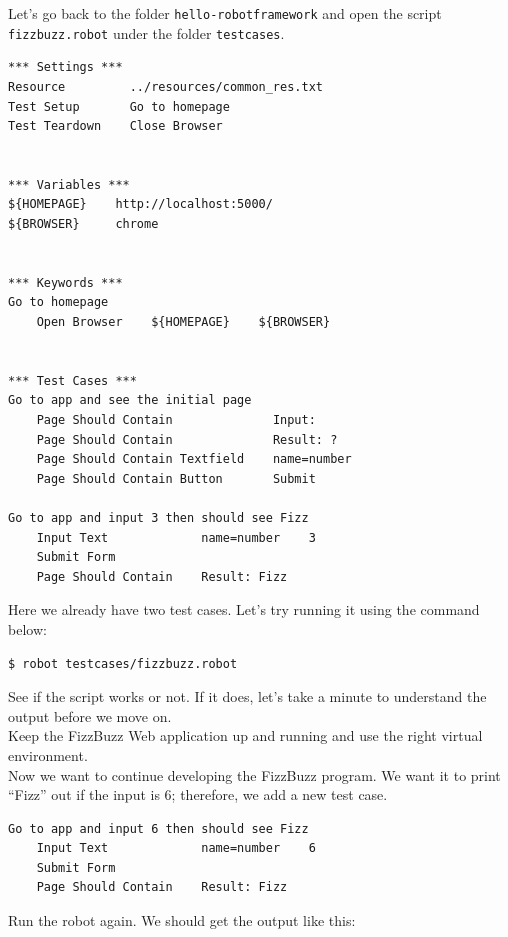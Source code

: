 \documentclass{article}
\begin{document}
\noindent Let's go back to the folder {\tt hello-robotframework} and open the
script {\tt fizzbuzz.robot} under the folder {\tt testcases}.

\begin{verbatim}
*** Settings ***
Resource         ../resources/common_res.txt
Test Setup       Go to homepage
Test Teardown    Close Browser


*** Variables ***
${HOMEPAGE}    http://localhost:5000/
${BROWSER}     chrome


*** Keywords ***
Go to homepage
    Open Browser    ${HOMEPAGE}    ${BROWSER}


*** Test Cases ***
Go to app and see the initial page
    Page Should Contain              Input:
    Page Should Contain              Result: ?
    Page Should Contain Textfield    name=number
    Page Should Contain Button       Submit

Go to app and input 3 then should see Fizz
    Input Text             name=number    3
    Submit Form
    Page Should Contain    Result: Fizz
\end{verbatim}

\noindent Here we already have two test cases. Let's try running it using the
command below:

\begin{verbatim}
$ robot testcases/fizzbuzz.robot
\end{verbatim}

\noindent See if the script works or not. If it does, let's take a minute to
understand the output before we move on. \\

 Keep the FizzBuzz Web application up and running and use
the right virtual environment. \\

\noindent Now we want to continue developing the FizzBuzz program. We want it
to print ``Fizz'' out if the input is 6; therefore, we add a new test case.

\begin{verbatim}
Go to app and input 6 then should see Fizz
    Input Text             name=number    6
    Submit Form
    Page Should Contain    Result: Fizz
\end{verbatim}

\noindent Run the robot again. We should get the output like this:
\end{document}

